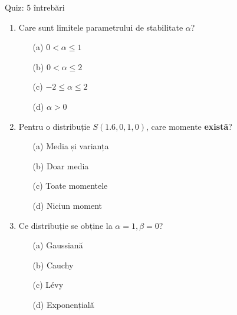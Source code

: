 \documentclass[9pt, aspectratio=169, t]{beamer}
\theoremstyle{definition}
\begin{document}
\begin{frame}{Quiz: 5 întrebări}
\begin{enumerate}
    \item Care sunt limitele parametrului de stabilitate $\alpha$?
    \begin{enumerate}
        \item[(a)] $0 < \alpha \leq 1$
        \item[(b)] $0 < \alpha \leq 2$
        \item[(c)] $-2 \leq \alpha \leq 2$
        \item[(d)] $\alpha > 0$
    \end{enumerate}

    \vspace{0.2cm}
    \item Pentru o distribuție $S(1.6, 0, 1, 0)$, care momente \textbf{există}?
    \begin{enumerate}
        \item[(a)] Media și varianța
        \item[(b)] Doar media
        \item[(c)] Toate momentele
        \item[(d)] Niciun moment
    \end{enumerate}

    \vspace{0.2cm}
    \item Ce distribuție se obține la $\alpha = 1, \beta = 0$?
    \begin{enumerate}
        \item[(a)] Gaussiană
        \item[(b)] Cauchy
        \item[(c)] L\'{e}vy
        \item[(d)] Exponențială
    \end{enumerate}
\end{enumerate}
\end{frame}
\end{document}
